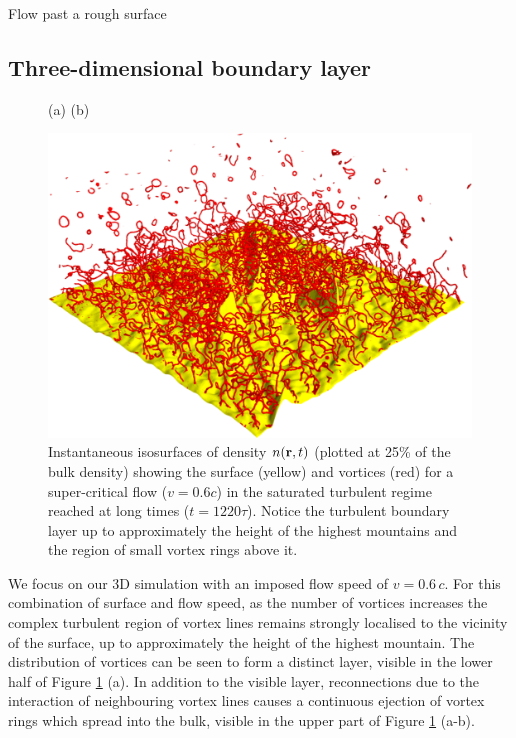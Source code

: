 \begin{chapter}{\label{cha:afm}Flow past a rough surface}
\subsection{Three-dimensional boundary layer}
\begin{figure}
(a) \hspace{7.2cm}(b)\vspace{-1cm}\\
\begin{center}
  \includegraphics[width=0.5\linewidth]{./afm/fig2-2b}%
\end{center}
\caption{Instantaneous isosurfaces of density $n({\bf r},t)$ 
(plotted at 25\%  of the bulk density) showing the surface (yellow) and vortices (red) for a super-critical flow ($v=0.6 c$) in the saturated 
turbulent regime reached at long times ($t=1220 \tau$).  Notice the turbulent boundary layer up to
approximately the height of the highest mountains and the region
of small vortex rings above it.}
\label{fig2}
\end{figure}
We focus on our 3D simulation with an imposed flow speed of $v=0.6\,c$. For this combination of surface and flow speed, as the number of vortices increases the complex turbulent region of vortex lines remains strongly localised to the vicinity of the surface, up to approximately the height of the highest mountain. The distribution of vortices can be seen to form a distinct layer, visible in the lower half of Figure \ref{fig2} (a). In addition to the visible layer, reconnections due to the interaction of neighbouring vortex lines causes a continuous ejection of vortex rings which spread into the bulk, visible in the upper part of Figure \ref{fig2} (a-b).


\end{chapter}
